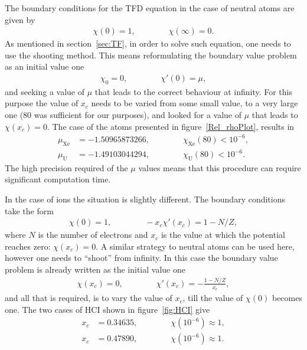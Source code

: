 The boundary conditions for the TFD equation in the case of neutral atoms are given by \cite{waber_relativistic_1975}
\begin{align}
  \chi(0) = 1, \qquad \qquad \chi(\infty) = 0. \label{eq:19}
\end{align}
As mentioned in section~\ref{sec:TF}, in order to solve such equation,
one needs to use the shooting method. This means reformulating the
boundary value problem as an initial value one
\begin{align}
  \chi_{0} = 0, \qquad \qquad \chi'(0) = \mu, \label{eq:21}
\end{align}
and seeking a value of $\mu$ that leads to the correct behaviour at infinity. For this purpose the value of $x_c$ needs to be varied from some small value, to a very large one (80 was sufficient for our purposes), and looked for a value of $\mu$ that leads to $\chi(x_c)=0$. The case of the atoms presented in figure~\ref{Rel_rhoPlot}, results in
\begin{align}
  \mu_{\mathrm{Xe}} &= -1.50965873266, \qquad  \qquad \chi_{\mathrm{Xe}}(80) < 10^{-6}, \label{eq:22}
  \\
  \mu_{\mathrm{U}} &= -1.49103044294, \qquad  \qquad \chi_{\mathrm{U}}(80) < 10^{-6}. \label{eq:23}
\end{align}
The high precision required of the $\mu$ values means that this procedure can require significant computation time.

In the case of ions the situation is slightly different. The boundary conditions take the form \cite{marini_relativistic_1981}
\begin{align}
  \chi(0) = 1, \qquad  \qquad  -x_{c}\chi'(x_{c}) = 1 - N/Z, \label{eq:20}
\end{align}
where $N$ is the number of electrons and $x_c$ is the value at which the potential reaches zero: $\chi(x_{c}) = 0$. A similar strategy to neutral atoms can be used here, however one needs to ``shoot'' from
infinity. In this case the boundary value problem is already written
as the initial value one
\begin{align}
  \chi(x_{c}) = 0, \qquad  \qquad \chi'(x_{c}) =
  -\frac{1-N/Z}{x_{c}}, \label{eq:24}
\end{align}
and all that is required, is to vary the value of $x_{c}$, till the value
of $\chi(0)$ becomes one. The two cases of HCI shown in figure~\ref{fig:HCI} give
\begin{align}
  x_{c}
  &= 0.34635, \qquad  \qquad \chi(10^{-6}) \approx 1, \label{eq:25}
  \\
  x_{c}
  &= 0.47890, \qquad  \qquad \chi(10^{-6}) \approx 1. \label{eq:26}
\end{align}

